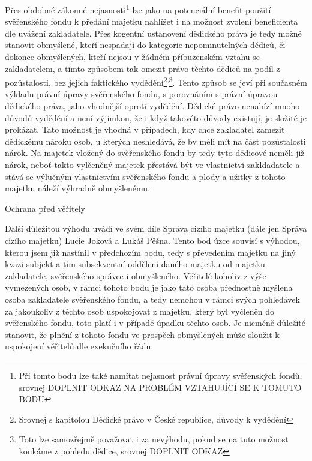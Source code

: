 \documentclass{article}
\begin{document}
 Přes obdobné zákonné nejasnosti\footnote{Při tomto bodu lze také namítat nejasnost právní úpravy svěřenských fondů, srovnej DOPLNIT ODKAZ NA PROBLÉM VZTAHUJÍCÍ SE K TOMUTO BODU} lze jako na potenciální benefit použití svěřen\-ského fondu k předání majetku nahlížet i na možnost zvolení beneficienta dle uvážení zakladatele. Přes kogentní ustanovení dědického práva je tedy možné stanovit obmyšlené, kteří nespadají do kategorie nepominutelných dědiců, či dokonce obmyšlených, kteří nejsou v žádném příbuzenském vztahu se zakladatelem, a tímto způsobem tak omezit právo těchto dědiců na podíl z pozůstalosti, bez jejich faktického vydědění\footnote{Srovnej s kapitolou Dědické právo v České republice, důvody k vydědění}\textsuperscript{,}\footnote{Toto lze samozřejmě považovat i za nevýhodu, pokud se na tuto možnost koukáme z pohledu dědice, srovnej DOPLNIT ODKAZ}. Tento způsob se jeví při současném výkladu právní úpravy svěřenského fondu, s porovnáním s právní úpravou dědického práva, jaho vhodnější oproti vydědění. Dědické právo nenabízí mnoho důvodů vydědění a není výjimkou, že i když takovéto důvody existují, je složité je prokázat. Tato možnost je vhodná v případech, kdy chce zakladatel zamezit dědickému nároku osob, u kterých neshledává, že by měli mít na část pozůstalosti nárok. Na majetek vložený do svěřenského fondu by tedy tyto dědicové neměli již nárok, neboť takto vylčeněný majetek přestává být ve vlastnictví zakldadatele a stává se výlučným vlastnictvím svěřenského fondu a plody a užitky z tohoto majetku náleží výhradně obmyšlenému.
 
 
 \newpage
 \thispagestyle{smallertextinheader}
  \begin{enumerate}
 {\Large\item[2.] Ochrana před věřitely}
 \end{enumerate}
 
 Další důležitou výhodu uvádí ve svém díle Správa cizího majetku (dále jen Správa cizího majetku) Lucie Joková a Lukáš Pěšna. Tento bod úzce souvisí s výhodou, kterou jsem již nastínil v předchozím bodu, tedy s převedením majetku na jiný kvazi subjekt a tím subsekventní oddělení daného majetku od majetku zakladatele, svěřenského správce i obmyšleného. Věřitelé koholiv z výše vymezených osob, v rámci tohoto bodu je jako tato osoba přednostně myšlena osoba zakladatele svěřenského fondu, a tedy nemohou v rámci svých pohledávek za jakoukoliv z těchto osob uspokojovat z majetku, který byl vyčleněn do svěřenského fondu, toto platí i v případě úpadku těchto osob. Je nicméně důležité stanovit, že plnění z tohoto fondu ve prospěch obmyšlených může sloužit k uspokojení věřitelů dle exekučního řádu.\\
 
\end{document}
